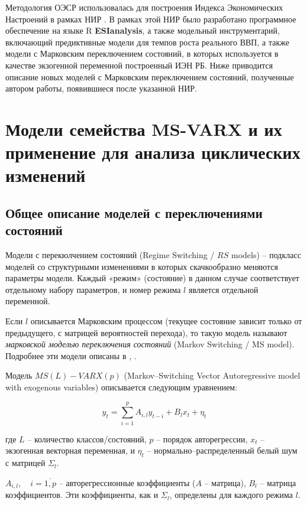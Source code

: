 \documentclass[../report.tex]{subfiles}
\begin{document}
	Методология ОЭСР использовалась для построения Индекса Экономических Настроений в рамках НИР \cite{esiMaking}. В рамках этой НИР было разработано программное обеспечение на языке R \textbf{ESIanalysis}, а также модельный инструментарий, включающий предиктивные модели для темпов роста реального ВВП, а также модели с Марковским переключением состояний, в которых используется в качестве экзогенной переменной построенный ИЭН РБ. Ниже приводится описание новых моделей с Марковским переключением состояний, полученные автором работы, появившиеся после указанной НИР.
	
	
	\section{Модели семейства MS-VARX и их применение для анализа циклических изменений}
	
	\subsection{Общее описание моделей с переключениями состояний}
	Модели с перекюлчением состояний (Regime Switching / $RS$ models) – подкласс моделей со структурными изменениями в которых скачкообразно меняются параметры модели. Каждый «режим» (состояние) в данном случае соответствует отдельному набору параметров, и номер режима $l$ является отдельной переменной.
	
	Если $l$ описывается Марковским процессом (текущее состояние зависит только от предыдущего, с матрицей вероятностей перехода), то такую модель называют \textit{марковской моделью переключения состояний} (Markov Switching / MS model). Подробнее эти модели описаны в \cite{malNovopMSVARX}, \cite{mal_methods_nonconstant}.
	
	Модель $MS(L)-VARX(p)$ (Markov–Switching Vector Autoregressive model with exogenous variables) описывается следующим уравнением:
	
	\begin{equation}
	y_{t}=\sum_{i=1}^{p} A_{i,l} y_{t-i} + B_{l} x_{t} + \eta_{t}
	\end{equation}
	
	где $L$ – количество классов/состояний, $p$ – порядок авторегрессии, $x_{t}$ – экзогенная векторная переменная, и $\eta_{t}$ – нормально–распределенный белый шум с матрицей $\Sigma_{l}$.
	
	$A_{i,l}, \quad i = \overline{1,p} $ – авторегрессионные коэффициенты ($A$ – матрица), $B_{l}$ – матрица коэффициентов. Эти коэффициенты, как и $\Sigma_{l}$, определены для каждого режима $l$.
	
\end{document}
